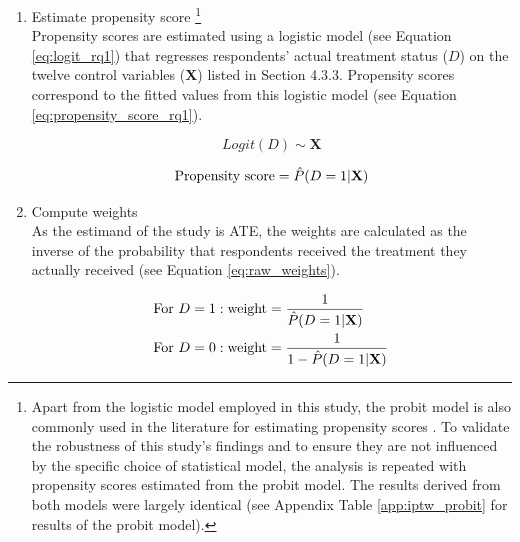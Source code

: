 \begin{enumerate}[wide=0pt, leftmargin=*, labelwidth=0pt, labelindent=\parindent, itemindent=0pt]
    \item Estimate propensity score \footnote{Apart from the logistic model employed in this study, the probit model is also commonly used in the literature for estimating propensity scores \parencite{abadie_matching_2016}. To validate the robustness of this study's findings and to ensure they are not influenced by the specific choice of statistical model, the analysis is repeated with propensity scores estimated from the probit model. The results derived from both models were largely identical (see Appendix Table \ref{app:iptw_probit} for results of the probit model).} \\
    Propensity scores are estimated using a logistic model (see Equation \ref{eq:logit_rq1}) that regresses respondents' actual treatment status ($D$) on the twelve control variables (\textbf{X}) listed in Section 4.3.3. Propensity scores correspond to the fitted values from this logistic model (see Equation \ref{eq:propensity_score_rq1}).

    \begin{equation}
        \label{eq:logit_rq1}
        Logit(D) \sim \textbf{X}
    \end{equation}

    \begin{equation}
        \label{eq:propensity_score_rq1}
        \textnormal{Propensity score} = \hat{P}(D = 1 | \textbf{X})
    \end{equation}

    \item Compute weights \\
    As the estimand of the study is ATE, the weights are calculated as the inverse of the probability that respondents received the treatment they actually received (see Equation \ref{eq:raw_weights}).

    \begin{equation}
        \label{eq:raw_weights}
        \begin{aligned}
            \textnormal{For } D &= 1: \textnormal{weight} = \frac{1}{\hat{P}(D = 1 | \textbf{X})} \\
            \textnormal{For } D &= 0: \textnormal{weight} = \frac{1}{1 - \hat{P}(D = 1 | \textbf{X})}
        \end{aligned}
    \end{equation}


\end{enumerate}
